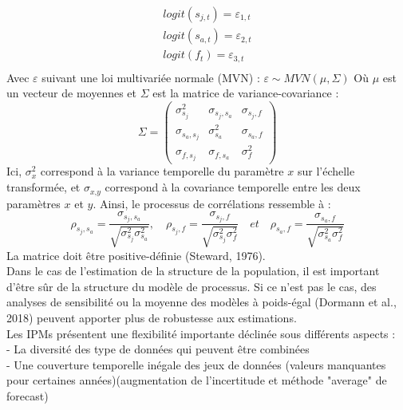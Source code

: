 \documentclass[12pt,a4paper]{article}
\begin{document}
\begin{equation}
\begin{aligned}
logit(s_{j,t}) = \varepsilon_{1,t}\\
logit(s_{a,t}) = \varepsilon_{2,t}\\
logit(f_{t}) = \varepsilon_{3,t}\\
\end{aligned}
\end{equation}
Avec $\varepsilon$ suivant une loi multivariée normale (MVN) :
$\varepsilon \sim MVN(\mu,\Sigma)$
Où $\mu$ est un vecteur de moyennes et $\Sigma$ est la matrice de variance-covariance : 
\begin{equation}
\Sigma = \begin{pmatrix}
    \sigma^2_{s_j}      & \sigma_{s_{j},s_{a}}  & \sigma_{s_{j},f}  \\ 
    \sigma_{s_{a},s_{j}}  & \sigma^2_{s_a}  & \sigma_{s_{a},f}  \\ 
    \sigma_{f,s_{j}}       & \sigma_{f,s_{a}}  & \sigma^2_{f} 
\end{pmatrix}
\end{equation}
Ici, $ \sigma^2_{\textit{x}}$  correspond à la variance temporelle du paramètre $\textit{x}$ sur l'échelle transformée, et $\sigma_{\textit{x},\textit{y}} $ correspond à la covariance temporelle entre les deux paramètres $\textit{x}$ et $\textit{y}$. Ainsi, le processus de corrélations ressemble à :
\begin{equation}
\rho_{s_{j},s_{a}}=\dfrac{\sigma_{s_{j},s_{a}}}{\sqrt{ \sigma^2_{s_j}  \sigma^2_{s_a} }},\quad \rho_{s_{j},f}=\dfrac{\sigma_{s_{j},f}}{\sqrt{ \sigma^2_{s_j}  \sigma^2_{f} }}\quad et \quad \rho_{s_{a},f}=\dfrac{\sigma_{s_{a},f}}{\sqrt{ \sigma^2_{s_a}  \sigma^2_{f} }}
\end{equation}
La matrice doit être positive-définie (Steward, 1976).\\
Dans le cas de l'estimation de la structure de la population, il est important d'être sûr de la structure du modèle de processus. Si ce n'est pas le cas, des analyses de sensibilité ou la moyenne des modèles à poids-égal (Dormann et al., 2018) peuvent apporter plus de robustesse aux estimations.\\
Les IPMs présentent une flexibilité importante déclinée sous différents aspects : \\
- La diversité des type de données qui peuvent être combinées\\
- Une couverture temporelle inégale des jeux de données (valeurs manquantes pour certaines années)(augmentation de l'incertitude et méthode "average" de forecast)\\
\end{document}
